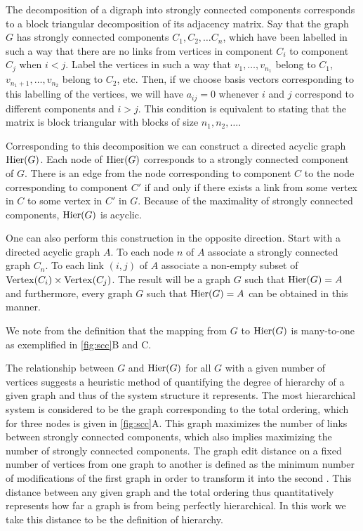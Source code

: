The decomposition of a digraph into strongly connected components corresponds to a block triangular decomposition of its adjacency matrix.  Say that the graph $G$ has strongly connected components $C_1, C_2, \ldots C_n$, which have been labelled in such a way that there are no links from vertices in component $C_i$ to component $C_j$ when $i < j$.  Label the vertices in such a way that $v_1, \ldots, v_{n_1}$ belong to $C_1$, $v_{n_1 + 1}, \ldots, v_{n_2}$ belong to $C_2$, etc.  Then, if we choose basis vectors corresponding to this labelling of the vertices, we will have $a_{ij} = 0$ whenever $i$ and $j$ correspond to different components and $i > j$.  This condition is equivalent to stating that the matrix is block triangular with blocks of size $n_1, n_2, \ldots$.

Corresponding to this decomposition we can construct a directed acyclic graph $\mathrm{Hier} (G)$.  Each node of $\mathrm{Hier} (G)$ corresponds to a strongly connected component of $G$. There is an edge from the node corresponding to component $C$ to the node corresponding to component $C'$ if and only if there exists a link from some vertex in $C$ to some vertex in $C'$ in $G$.  Because of the maximality of strongly connected components, $\mathrm{Hier} (G)$ is acyclic.

One can also perform this construction in the opposite direction.  Start with a directed acyclic graph $A$.  To each node $n$ of $A$ associate
a strongly connected graph $C_n$.  To each link $(i,j)$ of $A$ associate a non-empty subset of $\mathrm{Vertex}(C_i) \times \mathrm{Vertex}(C_j)$.  The result will be a graph $G$ such that $\mathrm{Hier}(G) = A$ and furthermore, every graph $G$ such that $\mathrm{Hier}(G) = A$ can be obtained in this manner.

We note from the definition that the mapping from $G$ to $\mathrm{Hier}(G)$ is many-to-one as exemplified in \ref{fig:scc}B and C.

The relationship between $G$ and $\mathrm{Hier}(G)$ for all $G$ with a given number of vertices suggests a heuristic method of quantifying the degree of hierarchy of a given graph and thus of the system structure it represents. The most hierarchical system is considered to be the graph corresponding to the total ordering, which for three nodes is given in \ref{fig:scc}A. This graph maximizes the number of links between strongly connected components, which also implies maximizing the number of strongly connected components. The graph edit distance on a fixed number of vertices from one graph to another is defined as the minimum number of modifications of the first graph in order to transform it into the second \cite{Axenovich2011}. This distance between any given graph and the total ordering thus quantitatively represents how far a graph is from being perfectly hierarchical. In this work we take this distance to be the definition of hierarchy.

